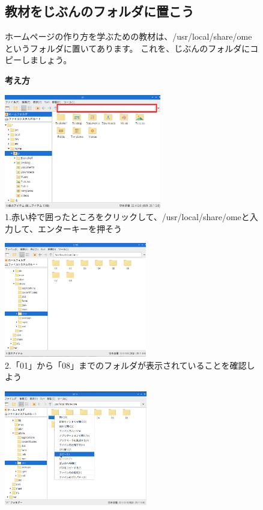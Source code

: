 \documentclass[a4paper,12pt]{jarticle}
\begin{document}
\begin{figure}
\subsection{教材をじぶんのフォルダに置こう}
ホームページの作り方を学ぶための教材は、/usr/local/share/omeというフォルダに置いてあります。
これを、じぶんのフォルダにコピーしましょう。

\textbf{考え方}

  \bigskip

  \centering
  \begin{minipage}{\textwidth}
    \begin{minipage}{0.45\linewidth}
      \includegraphics[width=\linewidth,height=5cm]{textbook-img1010.png}\\
      1.赤い枠で囲ったところをクリックして、/usr/local/share/omeと入力して、エンターキーを押そう
    \end{minipage}
    \hfill
    \vspace{20pt}
    \begin{minipage}{0.45\linewidth}
      \includegraphics[width=\linewidth,height=5cm]{textbook-img1011.png}\\
      2.「01」から「08」までのフォルダが表示されていることを確認しよう
    \end{minipage}
    \begin{minipage}{0.45\linewidth}
      \includegraphics[width=\linewidth,height=5cm]{textbook-img1012.png}\\

\end{minipage}
\end{minipage}
\end{figure}
\end{document}
